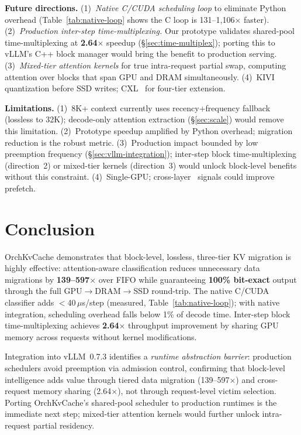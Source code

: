 \documentclass[conference]{IEEEtran}
\begin{document}
\textbf{Future directions.}
(1)~\emph{Native C/CUDA scheduling loop} to eliminate Python overhead (Table~\ref{tab:native-loop} shows the C loop is 131--1{,}106$\times$ faster).
(2)~\emph{Production inter-step time-multiplexing.} Our prototype validates shared-pool time-multiplexing at \textbf{2.64$\times$} speedup (\S\ref{sec:time-multiplex}); porting this to vLLM's C++ block manager would bring the benefit to production serving.
(3)~\emph{Mixed-tier attention kernels} for true intra-request partial swap, computing attention over blocks that span GPU and DRAM simultaneously.
(4)~KIVI~\cite{kivi} quantization before SSD writes; CXL~\cite{tpp} for four-tier extension.

\textbf{Limitations.}
(1)~8K+ context currently uses recency+frequency fallback (lossless to 32K); decode-only attention extraction (\S\ref{sec:scale}) would remove this limitation.
(2)~Prototype speedup amplified by Python overhead; migration reduction is the robust metric.
(3)~Production impact bounded by low preemption frequency (\S\ref{sec:vllm-integration}); inter-step block time-multiplexing (direction~2) or mixed-tier kernels (direction~3) would unlock block-level benefits without this constraint.
(4)~Single-GPU; cross-layer~\cite{infinigen} signals could improve prefetch.

\section{Conclusion}

OrchKvCache demonstrates that block-level, lossless, three-tier KV migration is highly effective: attention-aware classification reduces unnecessary data migrations by \textbf{139--597$\times$} over FIFO while guaranteeing \textbf{100\% bit-exact} output through the full GPU$\to$DRAM$\to$SSD round-trip. The native C/CUDA classifier adds $<$40\,$\mu$s/step (measured, Table~\ref{tab:native-loop}); with native integration, scheduling overhead falls below 1\% of decode time. Inter-step block time-multiplexing achieves \textbf{2.64$\times$} throughput improvement by sharing GPU memory across requests without kernel modifications.

Integration into vLLM~0.7.3 identifies a \emph{runtime abstraction barrier}: production schedulers avoid preemption via admission control, confirming that block-level intelligence adds value through tiered data migration (139--597$\times$) and cross-request memory sharing (2.64$\times$), not through request-level victim selection. Porting OrchKvCache's shared-pool scheduler to production runtimes is the immediate next step; mixed-tier attention kernels would further unlock intra-request partial residency.
\end{document}
